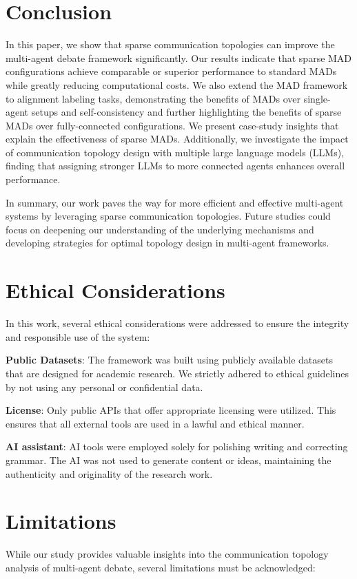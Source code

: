 \documentclass[11pt]{article}
\begin{document}
\section{Conclusion}
In this paper, we show that sparse communication topologies can improve the multi-agent debate framework significantly. Our results indicate that sparse MAD configurations achieve comparable or superior performance to standard MADs while greatly reducing computational costs. We also extend the MAD framework to alignment labeling tasks, demonstrating the benefits of MADs over single-agent setups and self-consistency and further highlighting the benefits of sparse MADs over fully-connected configurations. We present case-study insights that explain the effectiveness of sparse MADs. Additionally, we investigate the impact of communication topology design with multiple large language models (LLMs), finding that assigning stronger LLMs to more connected agents enhances overall performance.

In summary, our work paves the way for more efficient and effective multi-agent systems by leveraging sparse communication topologies. Future studies could focus on deepening our understanding of the underlying mechanisms and developing strategies for optimal topology design in multi-agent frameworks.

\section{Ethical Considerations}
In this work, several ethical considerations were addressed to ensure the integrity and responsible use of the system:

\noindent \textbf{Public Datasets}:  The framework was built using publicly available datasets that are designed for academic research. We strictly adhered to ethical guidelines by not using any personal or confidential data.

\noindent \textbf{License}: Only public APIs that offer appropriate licensing were utilized. This ensures that all external tools are used in a lawful and ethical manner.

\noindent \textbf{AI assistant}: AI tools were employed solely for polishing writing and correcting grammar. The AI was not used to generate content or ideas, maintaining the authenticity and originality of the research work.



\section{Limitations}
While our study provides valuable insights into the communication topology analysis of multi-agent debate, several limitations must be acknowledged:
\end{document}
